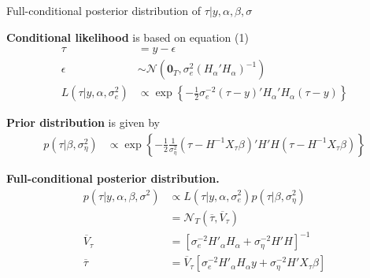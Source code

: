 \documentclass[notes,blackandwhite,mathsans,usenames,dvipsnames]{beamer}
\begin{document}
\begin{frame}{Full-conditional posterior distribution of $\tau|y,\alpha,\beta,\sigma$}

\small
\bigskip\textbf{Conditional likelihood} {\color{mcxs2}is based on equation} (1)
\begin{align*}
\tau &= y-\epsilon\\
\epsilon &\sim\mathcal{N}\left(\mathbf{0}_T, \sigma^2_e (H_{\alpha}'H_{\alpha})^{-1}\right)\\
L\left(\tau|y,\alpha,\sigma^2_e\right)&\propto\exp\left\{-\frac{1}{2}\sigma^{-2}_e(\tau-y)'H_\alpha'H_\alpha(\tau-y)  \right\}
\end{align*}

\smallskip\textbf{Prior distribution} {\color{mcxs2}is given by}
\begin{align*}
p\left(\tau|\beta,\sigma^2_\eta\right) &\propto \exp\left\{-\frac{1}{2}\frac{1}{\sigma^2_\eta} \left(\tau-H^{-1} X_\tau \beta\right)'H'H\left(\tau-H^{-1} X_\tau \beta\right) \right\}
\end{align*}

\smallskip\textbf{Full-conditional posterior distribution.}
\begin{align*}
p\left( \tau|y,\alpha,\beta,\sigma^2 \right)&\propto L\left(\tau|y,\alpha,\sigma^2_e\right)p\left(\tau|\beta,\sigma^2_\eta\right)\\
&= \mathcal{N}_T\left(\overline{\tau},\overline{V}_\tau\right)\\
\overline{V}_\tau &= \left[\sigma^{-2} _eH'_\alpha H_\alpha + \sigma^{-2} _\eta H' H \right]^{-1}\\
\overline{\tau} &= \overline{V}_\tau\left[\sigma^{-2} _eH'_\alpha H_\alpha y + \sigma^{-2} _\eta H' X_\tau \beta \right]
\end{align*}

\end{frame}
\end{document}
